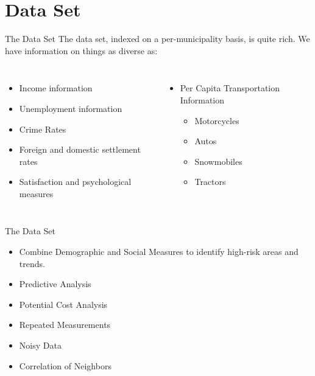 \documentclass{beamer}
\begin{document}
\section{Data Set}
\begin{frame}{The Data Set}
The data set, indexed on a per-municipality basis, is quite rich. We have information on things as diverse as:
\begin{columns}[T]
\begin{itemize}
\item Income information
\item Unemployment information
\item Crime Rates
\item Foreign and domestic settlement rates
\item Satisfaction and psychological measures
\end{itemize}
\begin{itemize}
\item Per Capita Transportation Information
\begin{itemize}
\item Motorcycles
\item Autos
\item Snowmobiles
\item Tractors
\end{itemize}
\end{itemize}
\end{columns}
\end{frame}

\begin{frame}{The Data Set}

{\color{blue}{Goal:}} 
\begin{itemize}
\item Combine Demographic and Social Measures to identify high-risk areas and trends.
\item Predictive Analysis
\item Potential Cost Analysis
\end{itemize}

\vspace{1cm}
\pause

{\color{blue}{Potential Pitfalls:}}
\begin{itemize}
\item  Repeated Measurements
\item  Noisy Data
\item  Correlation of Neighbors
\end{itemize}
\end{frame}
\end{document}
